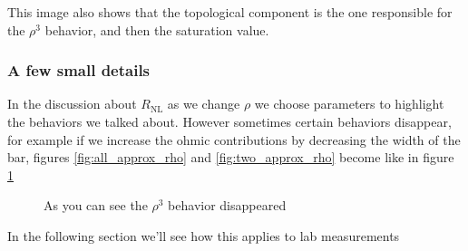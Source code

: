 This image also shows that the topological component is the one responsible for the $\rho^3$ behavior, and then the saturation value.

\subsubsection*{A few small details}
In the discussion about $R_{\textrm{NL}}$ as we change $\rho$ we choose parameters to highlight the behaviors we talked about. However sometimes certain behaviors disappear, for example if we increase the ohmic contributions by decreasing the width of the bar, figures \ref{fig:all_approx_rho} and \ref{fig:two_approx_rho} become like in figure \ref{fig:mixedrho}

\begin{figure}
    \caption{As you can see the $\rho^3$ behavior disappeared}
    \label{fig:mixedrho}
\end{figure}

In the following section we'll see how this applies to lab measurements

